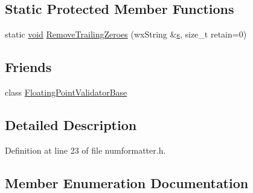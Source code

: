 \subsection*{Static Protected Member Functions}
\begin{DoxyCompactItemize}
\item 
static \hyperlink{sound_8c_ae35f5844602719cf66324f4de2a658b3}{void} \hyperlink{class_number_formatter_a461ec8e67ba39018fe0e786e54b3eaf1}{Remove\+Trailing\+Zeroes} (wx\+String \&\hyperlink{lib_2expat_8h_a755339d27872b13735c2cab829e47157}{s}, size\+\_\+t retain=0)
\end{DoxyCompactItemize}
\subsection*{Friends}
\begin{DoxyCompactItemize}
\item 
class \hyperlink{class_number_formatter_a4c2d28f618705ed70e44d4ffcc40a725}{Floating\+Point\+Validator\+Base}
\end{DoxyCompactItemize}


\subsection{Detailed Description}


Definition at line 23 of file numformatter.\+h.



\subsection{Member Enumeration Documentation}

